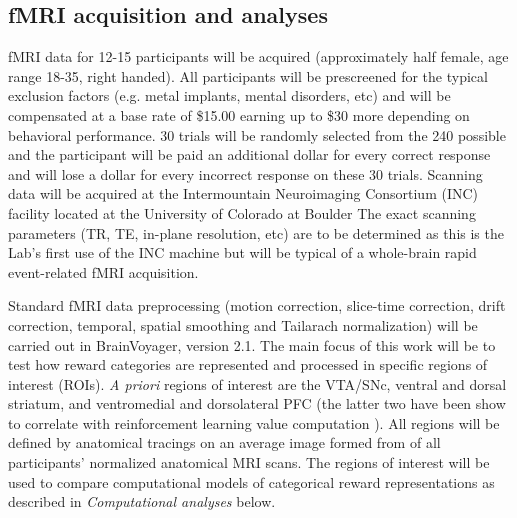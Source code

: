 \documentclass[doc,12pt]{apa}        %
\begin{document}
\subsection{fMRI acquisition and analyses} %
\label{sub:fmri}

fMRI data for 12-15 participants will be acquired (approximately half female, age range 18-35, right handed).   All participants will be prescreened for the typical exclusion factors (e.g. metal implants, mental disorders, etc) and will be compensated at a base rate of \$15.00 earning up to \$30 more depending on behavioral performance. 30 trials will be randomly selected from the 240 possible and the participant will be paid an additional dollar for every correct response and will lose a dollar for every incorrect response on these 30 trials. Scanning data will be acquired at the Intermountain Neuroimaging Consortium (INC) facility located at the University of Colorado at Boulder The exact scanning parameters (TR, TE, in-plane resolution, etc) are to be determined as this is the Lab's first use of the INC machine but will be typical of a whole-brain rapid event-related fMRI acquisition.

Standard fMRI data preprocessing (motion correction, slice-time correction, drift correction, temporal, spatial smoothing and Tailarach normalization) will be carried out in BrainVoyager, version 2.1.  The main focus of this work will be to test how reward categories are represented and processed in specific regions of interest (ROIs).  \emph{A priori} regions of interest are the VTA/SNc, ventral and dorsal striatum, and ventromedial and dorsolateral PFC (the latter two have been show to correlate with reinforcement learning value computation ).  All regions will be defined by anatomical tracings on an average image formed from of all participants' normalized anatomical MRI scans.  The regions of interest will be used to compare computational models of categorical reward representations as described in \emph{Computational analyses} below.
\end{document}
